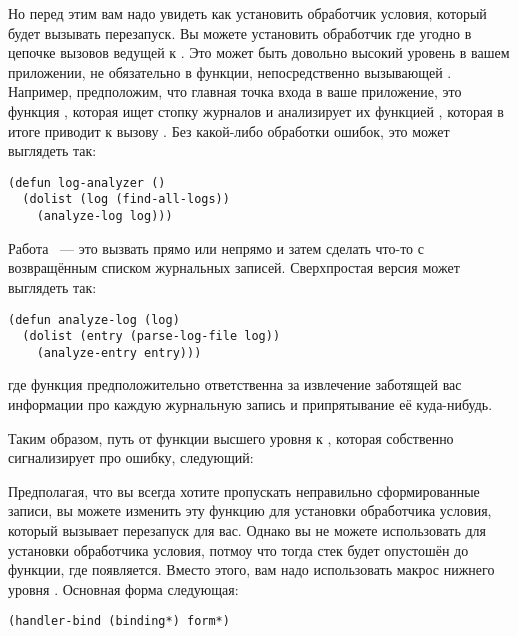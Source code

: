 Но перед этим вам надо увидеть как установить обработчик условия, который будет вызывать
 перезапуск. Вы можете установить обработчик где угодно в цепочке
вызовов ведущей к . Это может быть довольно высокий уровень в вашем
приложении, не обязательно в функции, непосредственно вызывающей
. Например, предположим, что главная точка входа в ваше приложение,
это функция , которая ищет стопку журналов и анализирует их функцией
, которая в итоге приводит к вызову . Без
какой-либо обработки ошибок, это может выглядеть так:

\begin{lstlisting}
(defun log-analyzer ()
  (dolist (log (find-all-logs))
    (analyze-log log)))
\end{lstlisting}

Работа ~--- это вызвать прямо или непрямо  и затем
сделать что-то с возвращённым списком журнальных записей. Сверхпростая версия может
выглядеть так:

\begin{lstlisting}
(defun analyze-log (log)
  (dolist (entry (parse-log-file log))
    (analyze-entry entry)))
\end{lstlisting}

где функция  предположительно ответственна за извлечение заботящей вас
информации про каждую журнальную запись и припрятывание её куда-нибудь.

Таким образом, путь от функции высшего уровня  к
, которая собственно сигнализирует про ошибку, следующий:


Предполагая, что вы всегда хотите пропускать неправильно сформированные записи, вы можете
изменить эту функцию для установки обработчика условия, который вызывает перезапуск
 для вас. Однако вы не можете использовать  для
установки обработчика условия, потмоу что тогда стек будет опустошён до функции, где
 появляется. Вместо этого, вам надо использовать макрос нижнего уровня
. Основная форма  следующая:

\begin{lstlisting}
(handler-bind (binding*) form*)
\end{lstlisting}

